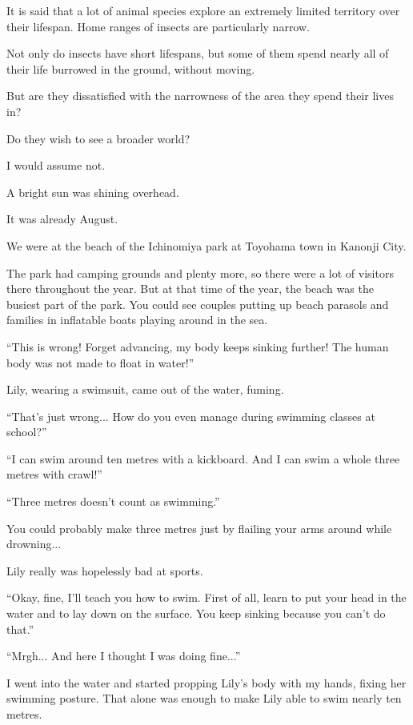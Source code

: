 

It is said that a lot of animal species explore an extremely limited territory over their lifespan. Home ranges of insects are particularly narrow.

Not only do insects have short lifespans, but some of them spend nearly all of their life burrowed in the ground, without moving.

But are they dissatisfied with the narrowness of the area they spend their lives in?

Do they wish to see a broader world?

I would assume not.

A bright sun was shining overhead.

It was already August.

We were at the beach of the Ichinomiya park at Toyohama town in Kanonji City.

The park had camping grounds and plenty more, so there were a lot of visitors there throughout the year. But at that time of the year, the beach was the busiest part of the park. You could see couples putting up beach parasols and families in inflatable boats playing around in the sea.

``This is wrong! Forget advancing, my body keeps sinking further! The human body was not made to float in water!''

Lily, wearing a swimsuit, came out of the water, fuming.

``That's just wrong... How do you even manage during swimming classes at school?''

``I can swim around ten metres with a kickboard. And I can swim a whole three metres with crawl!''

``Three metres doesn't count as swimming.''

You could probably make three metres just by flailing your arms around while drowning...

Lily really was hopelessly bad at sports.

``Okay, fine, I'll teach you how to swim. First of all, learn to put your head in the water and to lay down on the surface. You keep sinking because you can't do that.''

``Mrgh... And here I thought I was doing fine...''

I went into the water and started propping Lily's body with my hands, fixing her swimming posture. That alone was enough to make Lily able to swim nearly ten metres.

